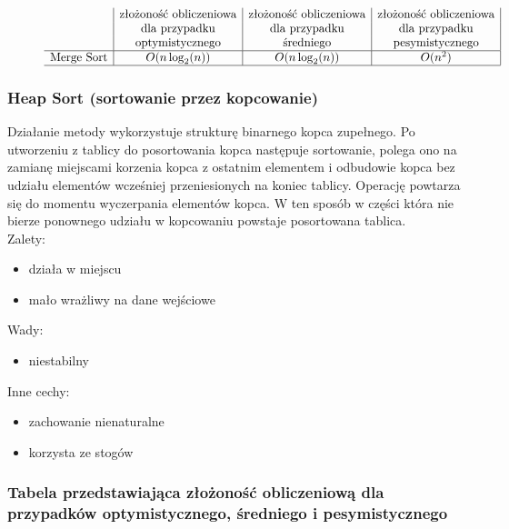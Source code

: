 \documentclass[polish,polish,a4paper]{article}
\begin{document}
\begin{spacing}{1.5}
\begin{figure}[H]
		\begin{equation*}
		\begin{array}{l|c|c|c|}

		&$złożoność obliczeniowa$&$złożoność obliczeniowa$&$złożoność obliczeniowa$\\
		&$dla przypadku$&$dla przypadku$&$dla przypadku$\\
		&$optymistycznego$&$średniego$&$pesymistycznego$\\
		\hline
		$Merge Sort$&O(n\log_{2}(n))&O(n\log_{2}(n))&O(n^2)\\
		\hline
		\end{array}
		\end{equation*}
	\end{figure}
	
			\subsubsection*{Heap Sort (sortowanie przez kopcowanie)}
			Działanie metody wykorzystuje strukturę binarnego kopca zupełnego. Po utworzeniu z tablicy do posortowania kopca następuje sortowanie, polega ono na zamianę miejscami korzenia kopca z ostatnim elementem i odbudowie kopca bez udziału elementów wcześniej przeniesionych na koniec tablicy. Operację powtarza się do momentu wyczerpania elementów kopca. W ten sposób w części która nie bierze ponownego udziału w kopcowaniu powstaje posortowana tablica.\\
						
Zalety:
\begin{itemize}
	\item działa w miejscu
	\item  mało wrażliwy na dane wejściowe
\end{itemize}
Wady:
\begin{itemize}
	\item niestabilny

\end{itemize}
Inne cechy:
\begin{itemize}
	\item zachowanie nienaturalne
	\item korzysta ze stogów
\end{itemize}

\subsubsection*{Tabela przedstawiająca złożoność obliczeniową dla przypadków optymistycznego, średniego i pesymistycznego} 
\begin{figure}[H]
	

\end{figure}
\end{spacing}
\end{document}
